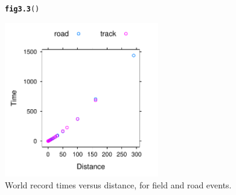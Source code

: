 \documentclass[12pt, a4paper,  BCOR=8.25mm, DIV=15]{scrartcl}\usepackage[]{graphicx}\usepackage[]{color}
\makeatletter
\newcommand{\hlstd}[1]{\textcolor[rgb]{0.345,0.345,0.345}{#1}}%
\newcommand{\hlkwd}[1]{\textcolor[rgb]{0.737,0.353,0.396}{\textbf{#1}}}%
\newenvironment{kframe}{%
 \def\at@end@of@kframe{}%
 \ifinner\ifhmode%
  \def\at@end@of@kframe{\end{minipage}}%
  \begin{minipage}{\columnwidth}%
 \fi\fi%
 \def\FrameCommand##1{\hskip\@totalleftmargin \hskip-\fboxsep
 \colorbox{shadecolor}{##1}\hskip-\fboxsep
     \hskip-\linewidth \hskip-\@totalleftmargin \hskip\columnwidth}%
 \MakeFramed {\advance\hsize-\width
   \@totalleftmargin\z@ \linewidth\hsize
   \@setminipage}}%
 {\par\unskip\endMakeFramed%
 \at@end@of@kframe}
\newenvironment{knitrout}{}{} %
\makeatother
\begin{document}
\begin{figure}
\begin{knitrout}
\color{fgcolor}\begin{kframe}
\begin{alltt}
\hlkwd{fig3.3}\hlstd{()}
\end{alltt}
\end{kframe}

{\centering \includegraphics[width=0.6\textwidth]{figure/exs-fig3_3e-1} 

}



\end{knitrout}
\caption{World record times versus distance, for field and road
  events.\label{fig:wrnolog}}
\end{figure}
\end{document}
